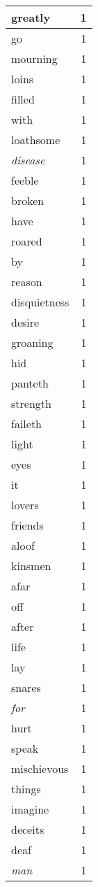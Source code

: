 \begin{center}
\begin{longtable}{l|r}
greatly & 1\\ \hline 
go & 1\\ \hline 
mourning & 1\\ \hline 
loins & 1\\ \hline 
filled & 1\\ \hline 
with & 1\\ \hline 
loathsome & 1\\ \hline 
\emph{disease} & 1\\ \hline 
feeble & 1\\ \hline 
broken & 1\\ \hline 
have & 1\\ \hline 
roared & 1\\ \hline 
by & 1\\ \hline 
reason & 1\\ \hline 
disquietness & 1\\ \hline 
desire & 1\\ \hline 
groaning & 1\\ \hline 
hid & 1\\ \hline 
panteth & 1\\ \hline 
strength & 1\\ \hline 
faileth & 1\\ \hline 
light & 1\\ \hline 
eyes & 1\\ \hline 
it & 1\\ \hline 
lovers & 1\\ \hline 
friends & 1\\ \hline 
aloof & 1\\ \hline 
kinsmen & 1\\ \hline 
afar & 1\\ \hline 
off & 1\\ \hline 
after & 1\\ \hline 
life & 1\\ \hline 
lay & 1\\ \hline 
snares & 1\\ \hline 
\emph{for} & 1\\ \hline 
hurt & 1\\ \hline 
speak & 1\\ \hline 
mischievous & 1\\ \hline 
things & 1\\ \hline 
imagine & 1\\ \hline 
deceits & 1\\ \hline 
deaf & 1\\ \hline 
\emph{man} & 1\\ \hline 

\end{longtable}
\end{center}
